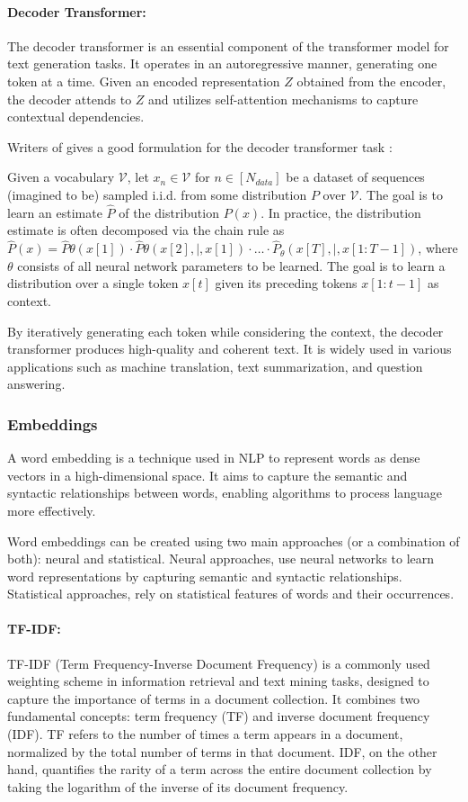 \documentclass[a4paper,12pt]{article}
\begin{document}
\paragraph{Decoder Transformer:}
The decoder transformer is an essential component of the transformer model for text generation tasks. It operates in an autoregressive manner, generating one token at a time. Given an encoded representation $Z$ obtained from the encoder, 
the decoder attends to $Z$ and utilizes self-attention mechanisms to capture contextual dependencies.

Writers of \cite{formaltransformer} gives a good formulation for the decoder transformer task : 

Given a vocabulary $\mathcal{V}$, let $x_n \in \mathcal{V}$ for $n \in [N_{data}]$ be a dataset of sequences (imagined to be) sampled i.i.d. from some distribution $P$ over $\mathcal{V}$. 
The goal is to learn an estimate $\hat{P}$ of the distribution $P(x)$. 
In practice, the distribution estimate is often decomposed via the chain rule as $\hat{P}(x) = \hat{P}{\theta}(x[1]) \cdot \hat{P}{\theta}(x[2] ,|, x[1]) \cdot \ldots \cdot \hat{P}_{\theta}(x[T] ,|, x[1:T-1])$, 
where $\theta$ consists of all neural network parameters to be learned. 
The goal is to learn a distribution over a single token $x[t]$ given its preceding tokens $x[1:t-1]$ as context.

By iteratively generating each token while considering the context, the decoder transformer produces high-quality and coherent text. 
It is widely used in various applications such as machine translation, text summarization, and question answering.




\subsubsection{Embeddings}
A word embedding is a technique used in NLP to represent words as dense vectors in a high-dimensional space. It aims to capture the semantic and syntactic relationships between words, enabling algorithms to process language more effectively.

Word embeddings can be created using two main approaches (or a combination of both): neural and statistical. 
Neural approaches, use neural networks to learn word representations by capturing semantic and syntactic relationships. Statistical approaches, rely on statistical features of words and their occurrences.

\paragraph{TF-IDF:}
TF-IDF (Term Frequency-Inverse Document Frequency) is a commonly used weighting scheme in information retrieval and text mining tasks, designed to capture the importance of terms in a document collection. It combines two fundamental concepts: term frequency (TF) and inverse document frequency (IDF). TF refers to the number of times a term appears in a document, normalized by the total number of terms in that document. IDF, on the other hand, quantifies the rarity of a term across the entire document collection by taking the logarithm of the inverse of its document frequency. 
\end{document}
